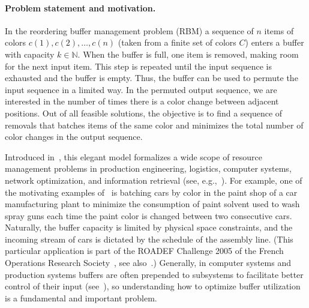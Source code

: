 \documentclass[11pt]{article}
\newcommand{\NN}{{\mathbb{N}}}
\begin{document}
\paragraph{Problem statement and motivation.}
In the reordering buffer management problem (RBM) a sequence
of $n$ items of colors $c(1),c(2),\dots,c(n)$ (taken from a finite
set of colors $C$) enters a buffer with capacity $k\in\NN$. When
the buffer is full, one item is removed, making room for the next
input item. This step is repeated until the input sequence is
exhausted and the buffer is empty. Thus, the buffer can be used
to permute the input sequence in a limited way. In the permuted
output sequence, we are interested in the number of times there
is a color change between adjacent positions. Out of all feasible
solutions, the objective is to find a sequence of removals that
batches items of the same color and minimizes the total number
of color changes in the output sequence.

Introduced in~\cite{RSW02}, this elegant model formalizes a wide
scope of resource management problems in production engineering,
logistics, computer systems, network optimization, and information
retrieval (see, e.g.,~\cite{RSW02,BB02,KRSW04,GSV04}).
For example, one of the motivating examples of~\cite{RSW02} is
batching cars by color in the paint shop of a car manufacturing plant
to minimize the consumption of paint solvent used to wash spray guns
each time the paint color is changed between two consecutive cars.
Naturally, the buffer capacity is limited by physical space constraints,
and the incoming stream of cars is dictated by the schedule of the
assembly line. (This particular application is part of the ROADEF
Challenge 2005 of the French Operations Research Society~\cite{ROADEF2005},
see also~\cite{GSV04}.)
Generally, in computer systems and production systems buffers
are often prepended to subsystems to facilitate better control of
their input (see~\cite{SGG09,LM09}), so understanding how to optimize
buffer utilization is a fundamental and important problem.
\end{document}
